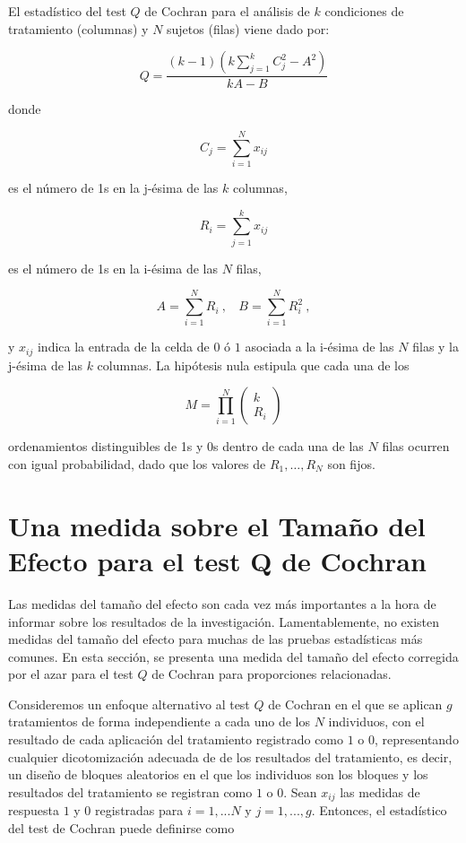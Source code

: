 \documentclass[12pt,a4paper,]{book}
\numberwithin{dummy}{section}
\theoremstyle{ocrenumbox}
\theoremstyle{blacknumex}
\theoremstyle{blacknumbox}
\theoremstyle{ocrenum}
\theoremstyle{ocrenum}
\begin{document}
El estadístico del test \(Q\) de Cochran para el análisis de \(k\)
condiciones de tratamiento (columnas) y \(N\) sujetos (filas) viene dado
por:

\[
Q=\frac{(k-1)(k\displaystyle\sum_{j=1}^kC_j^2-A^2)}{kA-B}
\]

donde

\[
C_j=\sum_{i=1}^Nx_{ij}
\]

es el número de 1s en la j-ésima de las \(k\) columnas,

\[
R_i=\sum_{j=1}^kx_{ij}
\]

es el número de 1s en la i-ésima de las \(N\) filas,

\[
A=\sum_{i=1}^NR_i~, ~~~~ B=\sum_{i=1}^NR_i^2~,
\]

y \(x_{ij}\) indica la entrada de la celda de \(0\) ó \(1\) asociada a
la i-ésima de las \(N\) filas y la j-ésima de las \(k\) columnas. La
hipótesis nula estipula que cada una de los

\[
M=\prod_{i=1}^N\left(\begin{array}{c}k\\ R_i\end{array}\right)
\]

ordenamientos distinguibles de 1s y 0s dentro de cada una de las \(N\)
filas ocurren con igual probabilidad, dado que los valores de
\(R_1,…,R_N\) son fijos.

\hypertarget{una-medida-sobre-el-tamauxf1o-del-efecto-para-el-test-q-de-cochran}{%
\section{Una medida sobre el Tamaño del Efecto para el test Q de
Cochran}\label{una-medida-sobre-el-tamauxf1o-del-efecto-para-el-test-q-de-cochran}}

Las medidas del tamaño del efecto son cada vez más importantes a la hora
de informar sobre los resultados de la investigación. Lamentablemente,
no existen medidas del tamaño del efecto para muchas de las pruebas
estadísticas más comunes. En esta sección, se presenta una medida del
tamaño del efecto corregida por el azar para el test \(Q\) de Cochran
para proporciones relacionadas.

Consideremos un enfoque alternativo al test \(Q\) de Cochran en el que
se aplican \(g\) tratamientos de forma independiente a cada uno de los
\(N\) individuos, con el resultado de cada aplicación del tratamiento
registrado como \(1\) o \(0\), representando cualquier dicotomización
adecuada de de los resultados del tratamiento, es decir, un diseño de
bloques aleatorios en el que los individuos son los bloques y los
resultados del tratamiento se registran como \(1\) o \(0\). Sean
\(x_{ij}\) las medidas de respuesta \(1\) y \(0\) registradas para
\(i = 1, . . . N\) y \(j = 1, . . . , g\). Entonces, el estadístico del
test de Cochran puede definirse como
\end{document}
